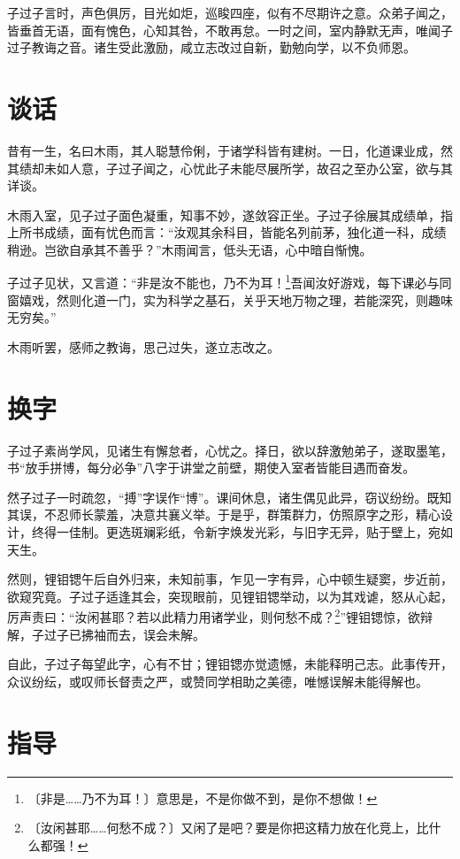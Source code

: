 \documentclass[b5paper,zihao=-4]{ctexbook}
\begin{document}
子过子言时，声色俱厉，目光如炬，巡睃四座，似有不尽期许之意。众弟子闻之，皆垂首无语，面有愧色，心知其咎，不敢再怠。一时之间，室内静默无声，唯闻子过子教诲之音。诸生受此激励，咸立志改过自新，勤勉向学，以不负师恩。

\chapter{谈话}

昔有一生，名曰木雨，其人聪慧伶俐，于诸学科皆有建树。一日，化道课业成，然其绩却未如人意，子过子闻之，心忧此子未能尽展所学，故召之至办公室，欲与其详谈。

木雨入室，见子过子面色凝重，知事不妙，遂敛容正坐。子过子徐展其成绩单，指上所书成绩，面有忧色而言：“汝观其余科目，皆能名列前茅，独化道一科，成绩稍逊。岂欲自承其不善乎？”木雨闻言，低头无语，心中暗自惭愧。

子过子见状，又言道：“非是汝不能也，乃不为耳！\footnote{〔非是……乃不为耳！〕意思是，不是你做不到，是你不想做！}吾闻汝好游戏，每下课必与同窗嬉戏，然则化道一门，实为科学之基石，关乎天地万物之理，若能深究，则趣味无穷矣。”

木雨听罢，感师之教诲，思己过失，遂立志改之。

\chapter{换字}

子过子素尚学风，见诸生有懈怠者，心忧之。择日，欲以辞激勉弟子，遂取墨笔，书“放手拼博，每分必争”八字于讲堂之前壁，期使入室者皆能目遇而奋发。

然子过子一时疏忽，“搏”字误作“博”。课间休息，诸生偶见此异，窃议纷纷。既知其误，不忍师长蒙羞，决意共襄义举。于是乎，群策群力，仿照原字之形，精心设计，终得一佳制。更选斑斓彩纸，令新字焕发光彩，与旧字无异，贴于壁上，宛如天生。

然则，锂钼锶午后自外归来，未知前事，乍见一字有异，心中顿生疑窦，步近前，欲窥究竟。子过子适逢其会，突现眼前，见锂钼锶举动，以为其戏谑，怒从心起，厉声责曰：“汝闲甚耶？若以此精力用诸学业，则何愁不成？\footnote{〔汝闲甚耶……何愁不成？〕又闲了是吧？要是你把这精力放在化竞上，比什么都强！}”锂钼锶惊，欲辩解，子过子已拂袖而去，误会未解。

自此，子过子每望此字，心有不甘；锂钼锶亦觉遗憾，未能释明己志。此事传开，众议纷纭，或叹师长督责之严，或赞同学相助之美德，唯憾误解未能得解也。

\chapter{指导}
\end{document}
